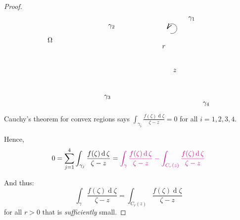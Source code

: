 \documentclass[12pt]{article}
\renewcommand{\d}{\ensuremath{\operatorname{d}}}
\begin{document}
\begin{proof}
\[\begin{tikzpicture}[x=0.75pt,y=0.75pt,yscale=-1,xscale=1]
            \draw  [draw opacity=0] (318.16,77.44) .. controls (319.16,77.8) and (320.24,78) .. (321.37,78) .. controls (326.54,78) and (330.74,73.81) .. (330.74,68.63) .. controls (330.74,63.46) and (326.54,59.26) .. (321.37,59.26) .. controls (316.19,59.26) and (312,63.46) .. (312,68.63) .. controls (312,68.84) and (312.01,69.05) .. (312.02,69.25) -- (321.37,68.63) -- cycle ; \draw    (318.16,77.44) .. controls (319.16,77.8) and (320.24,78) .. (321.37,78) .. controls (326.54,78) and (330.74,73.81) .. (330.74,68.63) .. controls (330.74,63.46) and (326.54,59.26) .. (321.37,59.26) .. controls (316.19,59.26) and (312,63.46) .. (312,68.63) ; \draw [shift={(312.02,69.25)}, rotate = 302.63] [color=black  ][line width=0.75]    (10.93,-3.29) .. controls (6.95,-1.4) and (3.31,-0.3) .. (0,0) .. controls (3.31,0.3) and (6.95,1.4) .. (10.93,3.29)   ; 
            
            \draw (79.38,84.37) node [anchor=north west][inner sep=0.75pt]    {$\Omega $};
            \draw (196.73,59.09) node [anchor=north west][inner sep=0.75pt]    {$\gamma _{2}$};
            \draw (322.21,145.09) node [anchor=north west][inner sep=0.75pt]    {$z$};
            \draw (300.95,99.47) node [anchor=north west][inner sep=0.75pt]    {$r$};
            \draw (351.73,44.09) node [anchor=north west][inner sep=0.75pt]    {$\gamma _{1}$};
            \draw (188.73,195.09) node [anchor=north west][inner sep=0.75pt]    {$\gamma _{3}$};
            \draw (379.73,208.09) node [anchor=north west][inner sep=0.75pt]    {$\gamma _{4}$};
            
            
            \end{tikzpicture}
            \]
            Cauchy's theorem for convex regions says $\int_{\gamma_i}\frac{f(\zeta)\d \zeta}{\zeta-z}=0$ for all $i=1,2,3,4$.

            Hence, \[0=\sum_{j=1}^{4}\int_{\gamma_j}\frac{f(\zeta)\d \zeta}{\zeta-z}=\rt{
                \int_{\gamma}\frac{f(\zeta)\d \zeta}{\zeta-z} - \int_{C_r(z)}\frac{f(\zeta)\d \zeta}{\zeta-z}
            }\]

            And thus: \[ \int_{\gamma}\frac{f(\zeta)\d \zeta}{\zeta-z}= \int_{C_r(z)}\frac{f(\zeta)\d \zeta}{\zeta-z}\] for all $r>0$ that is \textit{sufficiently} small.


\end{proof}
\end{document}

